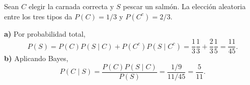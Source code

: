 Sean $C$ elegir la carnada correcta y $S$ pescar un salmón. La elección aleatoria entre los tres tipos da $P(C)=1/3$ y $P(C^c)=2/3$.

\textbf{a)} Por probabilidad total,
\[
 P(S)=P(C)P(S\mid C)+P(C^c)P(S\mid C^c)
 =\frac13\frac13+\frac23\frac15
 =\boxed{\frac{11}{45}}.
\]
\textbf{b)} Aplicando Bayes,
\[
 P(C\mid S)=\frac{P(C)P(S\mid C)}{P(S)}
 =\frac{1/9}{11/45}=\boxed{\frac5{11}}.
\]
